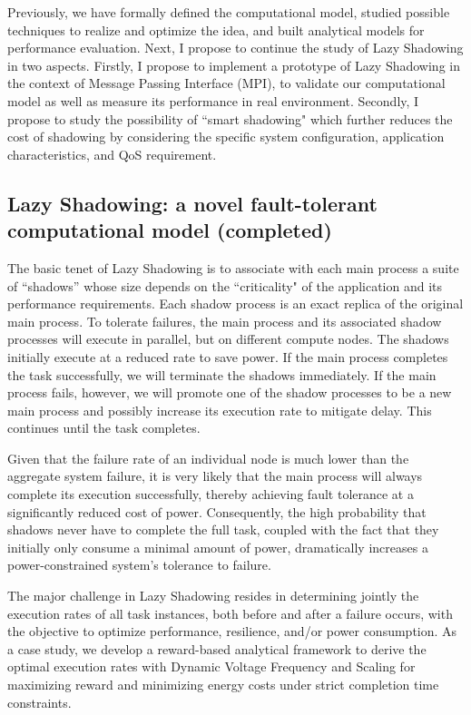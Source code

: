 Previously, we have formally defined the computational model, studied possible techniques to realize and optimize the idea, and 
built analytical models for performance evaluation. Next, I propose to continue the study of Lazy Shadowing in two aspects.
Firstly, I propose to implement a prototype of Lazy Shadowing in the context of Message Passing Interface (MPI), to validate our 
computational model as well as measure its performance in real environment. Secondly, I propose to study the possibility of 
``smart shadowing" which further reduces the cost of shadowing by considering the specific system configuration, application characteristics, and QoS requirement.

\subsection{Lazy Shadowing: a novel fault-tolerant computational model (completed)}

The basic tenet of Lazy Shadowing is to associate with each main process a suite of “shadows” whose size depends on the 
``criticality" of the application and its performance requirements. Each shadow process is an exact replica of the original 
main process. To tolerate failures, the main process and its associated shadow processes will execute in parallel, but on 
different compute nodes. 
The shadows initially execute at a reduced rate %
to save power. 
If the main process completes the task successfully, we will 
terminate the shadows immediately. If the main process fails, however, we will promote one of the shadow processes to be a 
new main process and possibly increase its execution rate to mitigate delay. This continues until the task completes. 

Given that the failure rate of an individual node is much lower than the aggregate system failure, it is very likely that 
the main process will always complete its execution successfully, thereby achieving fault tolerance at a significantly reduced 
cost of power. Consequently, the high probability that shadows never have to complete the full task, coupled with the fact that 
they initially only consume a minimal amount of power, dramatically increases a power-constrained system's tolerance to failure.

The major challenge in Lazy Shadowing resides in determining jointly the execution rates of all task instances, 
both before and after a failure occurs, with the objective to optimize performance, resilience, and/or power consumption.
As a case study, we develop a reward-based analytical framework to derive the optimal execution rates with Dynamic Voltage 
Frequency and Scaling for maximizing reward and minimizing energy 
costs under strict completion time constraints.  

